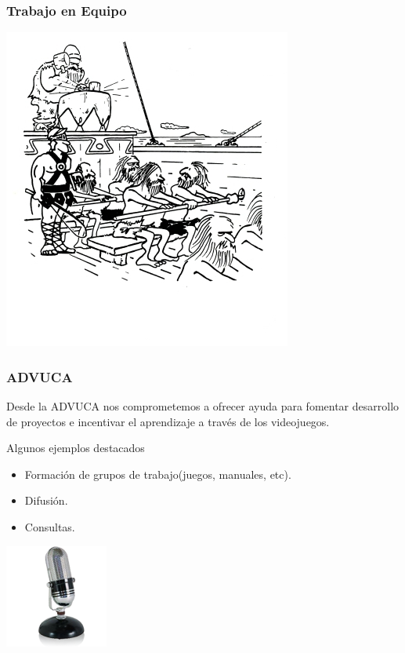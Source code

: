 \begin{frame}
	\frametitle{Trabajo en Equipo}
	
	\begin{center}
		\includegraphics[scale=0.70]{img/equipo.jpg}
	\end{center}

\end{frame}


\begin{frame}
	\frametitle{ADVUCA}
		
	Desde la ADVUCA nos comprometemos a ofrecer ayuda para fomentar desarrollo de proyectos e incentivar el aprendizaje a través de los videojuegos.

	\begin{block}{Algunos ejemplos destacados}
		\begin{itemize}
			\item Formación de grupos de trabajo(juegos, manuales, etc).
			\item Difusión.
			\item Consultas.
		\end{itemize}
	\end{block}

	\begin{center}
		\includegraphics[scale=0.50]{img/micro.png}
	\end{center}

\end{frame}

